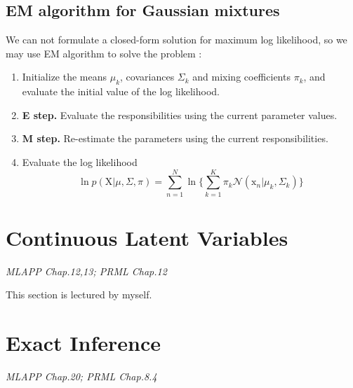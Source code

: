 \documentclass{article}
\newcommand{\normD}{\mathcal{N}}
\newcommand{\mrm}{\mathrm}
\begin{document}
\subsection{EM algorithm for Gaussian mixtures}
We can not formulate a closed-form solution for maximum log likelihood, so we may use EM algorithm to solve the problem :
\begin{enumerate}
  \item Initialize the means $\mu_k$, covariances $\Sigma_k$ and mixing coefficients $\pi_k$, and evaluate the initial value of the log likelihood.
  \item \textbf{E step.} Evaluate the responsibilities using the current parameter values.
  \item \textbf{M step.} Re-estimate the parameters using the current responsibilities.
  \item Evaluate the log likelihood
  \begin{equation}\label{}
    \ln p(\mrm X|\mu,\Sigma,\pi)=\sum_{n=1}^{N}\ln \{\sum_{k=1}^{K}\pi_k\normD(\mrm x_n|\mu_k,\Sigma_k)\}
  \end{equation}
\end{enumerate}

\section{Continuous Latent Variables}
\emph{MLAPP Chap.12,13; PRML Chap.12}

This section is lectured by myself.

\section{Exact Inference}
\emph{MLAPP Chap.20; PRML Chap.8.4}
\end{document}
